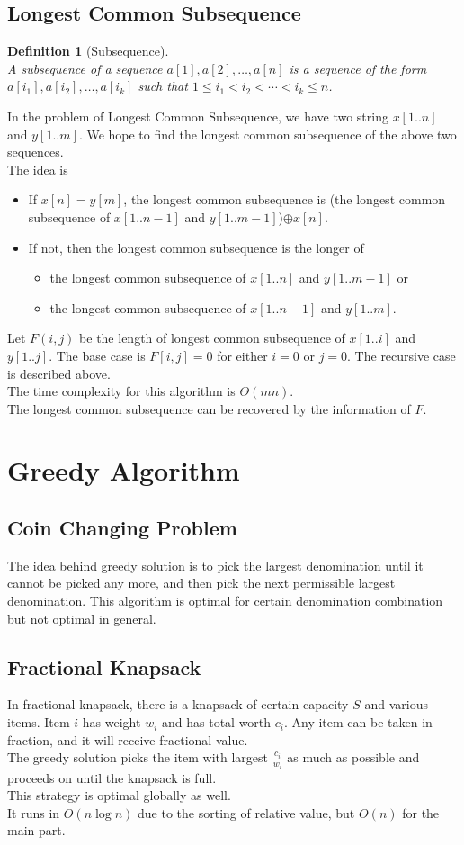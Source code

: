 \documentclass[12pt]{article}
\newtheorem{definition}{Definition}[section]
\theoremstyle{definition}
\newcommand{\T}{\Theta}
\begin{document}
\subsection{Longest Common Subsequence}
\begin{definition}[Subsequence]
\hfill\\\normalfont A subsequence of a sequence $a[1], a[2],\ldots, a[n]$ is a sequence of the form $a[i_1], a[i_2],\ldots, a[i_k]$ such that $1\leq i_1<i_2<\cdots <i_k\leq n$.
\end{definition}
In the problem of Longest Common Subsequence, we have two string $x[1..n]$ and $y[1..m]$. We hope to find the longest common subsequence of the above two sequences.\\
The idea is
\begin{itemize}
  \item If $x[n]=y[m]$, the longest common subsequence is (the longest common subsequence of $x[1..n-1]$ and $y[1..m-1]$)$\oplus x[n]$.
  \item If not, then the longest common subsequence is the longer of
  \begin{itemize}
    \item the longest common subsequence of $x[1..n]$ and $y[1..m-1]$ or
    \item the longest common subsequence of $x[1..n-1]$ and $y[1..m]$.
  \end{itemize}
\end{itemize}
Let $F(i,j)$ be the length of longest common subsequence of $x[1..i]$ and $y[1..j]$. The base case is $F[i,j]=0$ for either $i=0$ or $j=0$. The recursive case is described above.\\
The time complexity for this algorithm is $\T(mn)$.\\
The longest common subsequence can be recovered by the information of $F$.
\clearpage
\section{Greedy Algorithm}
\subsection{Coin Changing Problem}
The idea behind greedy solution is to pick the largest denomination until it cannot be picked any more, and then pick the next permissible largest denomination. This algorithm is optimal for certain denomination combination but not optimal in general.
\subsection{Fractional Knapsack}
In fractional knapsack, there is a knapsack of certain capacity $S$ and various items. Item $i$ has weight $w_i$ and has total worth $c_i$. Any item can be taken in fraction, and it will receive fractional value.\\
The greedy solution picks the item with largest $\frac{c_i}{w_i}$ as much as possible and proceeds on until the knapsack is full.\\
This strategy is optimal globally as well.\\
It runs in $O(n\log n)$ due to the sorting of relative value, but $O(n)$ for the main part.
\end{document}
